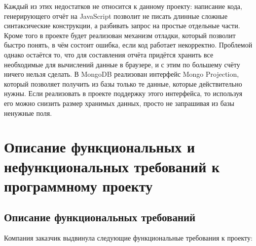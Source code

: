 \documentclass[12pt]{article}
\begin{document}
    Каждый из этих недостатков не относится к данному проекту: написание кода, генерирующего отчёт на JavaScript позволит не писать длинные
    сложные синтаксические конструкции, а разбивать запрос на простые отдельные части. Кроме того в проекте будет реализован механизм отладки,
    который позволит быстро понять, в чём состоит ошибка, если код работает некорректно. Проблемой однако остаётся то, что для составления
    отчёта придётся хранить все необходимые для вычислений данные в браузере, и с этим по большему счёту ничего нельзя сделать. В MongoDB
    реализован интерфейс Mongo Projection, который позволяет получить из базы только те данные, которые действительно нужны. Если реализовать
    в проекте поддержку этого интерфейса, то используя его можно снизить размер хранимых данных, просто не запрашивая из базы ненужные поля.
    \newpage


    \section{Описание функциональных и нефункциональных требований к программному проекту}

    \subsection{Описание функциональных требований}
    Компания заказчик выдвинула следующие функциональные требования к проекту:
\end{document}
